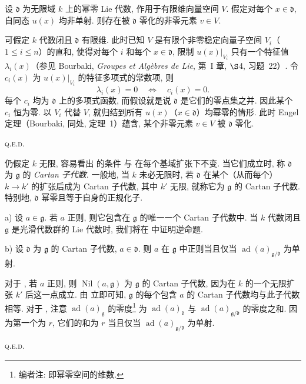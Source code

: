 \begin{lemma}
设 \(\mathfrak d\) 为无限域 \(k\) 上的幂零 Lie 代数, 作用于有限维向量空间 \(V\). 假定对每个 \(x\in\mathfrak d\), 自同态 \(u(x)\) 均非单射. 则存在被 \(\mathfrak d\) 零化的非零元素 \(v\in V\).
\end{lemma}

可假定 \(k\) 代数闭且 \(\mathfrak d\) 有限维. 此时已知 \(V\) 是有限个非零稳定向量子空间 \(V_i\)（\(1\leq i\leq n\)）的直和, 使得对每个 \(i\) 和每个 \(x\in\mathfrak d\), 限制 \(u(x)|_{V_i}\) 只有一个特征值 \(\lambda_i(x)\)（参见 Bourbaki, \emph{Groupes et Algèbres de Lie}, 第~I 章, \(\S\)4, 习题~22）. 令 \(c_i(x)\) 为 \(u(x)|_{V_i}\) 的特征多项式的常数项, 则
\[
  \lambda_i(x)=0\quad\Longleftrightarrow\quad c_i(x)=0.
\]
每个 \(c_i\) 均为 \(\mathfrak d\) 上的多项式函数, 而假设就是说 \(\mathfrak d\) 是它们的零点集之并. 因此某个 \(c_i\) 恒为零. 以 \(V_i\) 代替 \(V\), 就归结到所有 \(u(x)\)（\(x\in\mathfrak d\)）均幂零的情形. 此时 Engel 定理（Bourbaki, 同处, 定理~1）蕴含, 某个非零元素 \(v\in V\) 被 \(\mathfrak d\) 零化.
\par\hfill\textsc{q.e.d.}

仍假定 \(k\) 无限, 容易看出  的条件  与  在每个基域扩张下不变. 当它们成立时, 称 \(\mathfrak d\) 为 \(\mathfrak g\) 的 \emph{Cartan 子代数}. 一般地, 当 \(k\) 未必无限时, 若 \(\mathfrak d\) 在某个（从而每个）\(k\to k'\) 的扩张后成为 Cartan 子代数, 其中 \(k'\) 无限, 就称它为 \(\mathfrak g\) 的 Cartan 子代数. 特别地, \(\mathfrak d\) 幂零且等于自身的正规化子.

\begin{proposition}
\textup{a)} 设 \(a\in\mathfrak g\). 若 \(a\) 正则, 则它包含在 \(\mathfrak g\) 的唯一一个 Cartan 子代数中. 当 \(k\) 代数闭且 \(\mathfrak g\) 是光滑代数群的 Lie 代数时, 我们将在  中证明逆命题.

\textup{b)} 设 \(\mathfrak d\) 为 \(\mathfrak g\) 的 Cartan 子代数, \(a\in\mathfrak d\). 则 \(a\) 在 \(\mathfrak g\) 中正则当且仅当 \(\operatorname{ad}(a)_{\mathfrak g/\mathfrak d}\) 为单射.
\end{proposition}

对于 , 若 \(a\) 正则, 则 \(\operatorname{Nil}(a,\mathfrak g)\) 为 \(\mathfrak g\) 的 Cartan 子代数, 因为在 \(k\) 的一个无限扩张 \(k'\) 后这一点成立. 由  立即可知, \(\mathfrak g\) 的每个包含 \(a\) 的 Cartan 子代数均与此子代数相等. 对于 , 注意 \(\operatorname{ad}(a)_{\mathfrak g}\) 的零度\footnote{编者注: 即幂零空间的维数.} 为 \(\operatorname{ad}(a)_{\mathfrak d}\) 与 \(\operatorname{ad}(a)_{\mathfrak g/\mathfrak d}\) 的零度之和. 因为第一个为 \(r\), 它们的和为 \(r\) 当且仅当 \(\operatorname{ad}(a)_{\mathfrak g/\mathfrak d}\) 为单射.
\par\hfill\textsc{q.e.d.}

